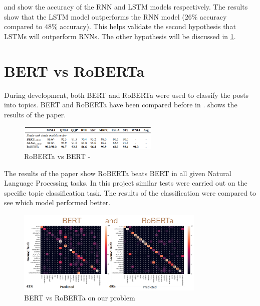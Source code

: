  and  show the accuracy of the RNN and LSTM models respectively. The results show that
the LSTM model outperforms the RNN model ($26\%$ accuracy compared to $48\%$ accuracy). This helps validate the second hypothesis
that LSTMs will outperform RNNs. The other hypothesis will be discussed in \cref{sec:bert-vs-roberta}.
\section{BERT vs RoBERTa}
\label{sec:bert-vs-roberta}
During development, both BERT and RoBERTa were used to classify the posts into topics.
BERT and RoBERTa have been compared before in \cite{DBLP:journals/corr/abs-1907-11692}.  shows the
results of the paper.
\begin{figure}[hbtp]
    \centering
    \includegraphics[width=0.6\textwidth]{../images/roberta-tasks.png}
    \caption{RoBERTa vs BERT - \cite{DBLP:journals/corr/abs-1907-11692}}
    \label{fig:bert-vs-roberta-paper}
\end{figure}

The results of the paper show RoBERTa beats BERT in all given Natural Language Processing tasks. In this project similar tests
were carried out on the specific topic classification task. The results of the classification were
compared to see which model performed better.
\begin{figure}[hbtp]
    \centering
    \includegraphics[width=0.8\textwidth]{../images/bert-vs-roberta.png}
    \caption{BERT vs RoBERTa on our problem}
    \label{fig:bert-vs-roberta}
\end{figure}

